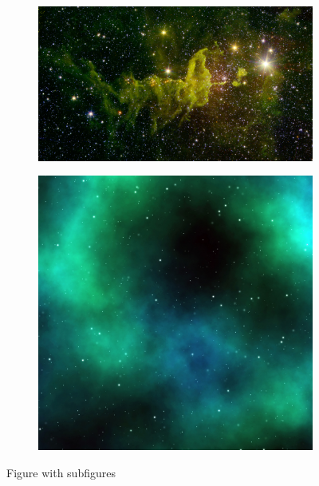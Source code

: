\begin{figure}[hbt!]
  \centering
  \begin{subfigure}[c]{0.49\textwidth}
    \centering
    \includegraphics[width=\linewidth]{figures/figure1.jpg}
    \caption{}\label{fig:subfig-a}
  \end{subfigure}
  \begin{subfigure}[c]{0.49\textwidth}
    \centering
    \includegraphics[width=\linewidth]{figures/figure2.jpg}
    \caption{}\label{fig:subfig-b}
  \end{subfigure}
  \caption{Figure with subfigures}\label{fig:subfig}
\end{figure}

